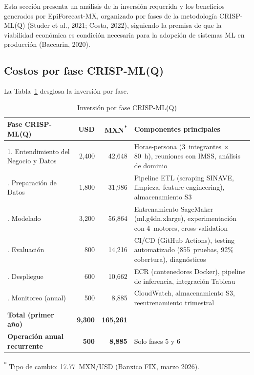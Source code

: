 \documentclass[12pt, letterpaper]{article}
\newcommand{\tabref}[1]{Tabla~\ref{#1}}
\begin{document}
Esta sección presenta un análisis de la inversión requerida y los beneficios generados por EpiForecast-MX, organizado por fases de la metodología CRISP-ML(Q) (Studer et al., 2021; Costa, 2022), siguiendo la premisa de que la viabilidad económica es condición necesaria para la adopción de sistemas ML en producción (Baccarin, 2020).

\subsection{Costos por fase CRISP-ML(Q)}

La \tabref{tab:costos_crispml} desglosa la inversión por fase.

\begin{table}[H]
\centering
\caption{Inversión por fase CRISP-ML(Q)}
\label{tab:costos_crispml}
\small
\begin{tabularx}{\textwidth}{l r r >{\raggedright\arraybackslash}X}
\toprule
\textbf{Fase CRISP-ML(Q)} & \textbf{USD} & \textbf{MXN\textsuperscript{*}} & \textbf{Componentes principales} \\
\midrule
1. Entendimiento del Negocio y Datos & 2,400 & 42,648 & Horas-persona (3~integrantes $\times$ 80~h), reuniones con IMSS, análisis de dominio \\
\addlinespace
2. Preparación de Datos & 1,800 & 31,986 & Pipeline ETL (scraping SINAVE, limpieza, feature engineering), almacenamiento S3 \\
\addlinespace
3. Modelado & 3,200 & 56,864 & Entrenamiento SageMaker (ml.g4dn.xlarge), experimentación con 4~motores, cross-validation \\
\addlinespace
4. Evaluación & 800 & 14,216 & CI/CD (GitHub Actions), testing automatizado (855~pruebas, 92\% cobertura), diagnósticos \\
\addlinespace
5. Despliegue & 600 & 10,662 & ECR (contenedores Docker), pipeline de inferencia, integración Tableau \\
\addlinespace
6. Monitoreo (anual) & 500 & 8,885 & CloudWatch, almacenamiento S3, reentrenamiento trimestral \\
\midrule
\textbf{Total (primer año)} & \textbf{9,300} & \textbf{165,261} & \mbox{} \\
\textbf{Operación anual recurrente} & \textbf{500} & \textbf{8,885} & Solo fases 5 y 6 \\
\bottomrule
\end{tabularx}
\begin{flushleft}
\scriptsize \textsuperscript{*} Tipo de cambio: 17.77~MXN/USD (Banxico FIX, marzo 2026).
\end{flushleft}
\end{table}
\end{document}
